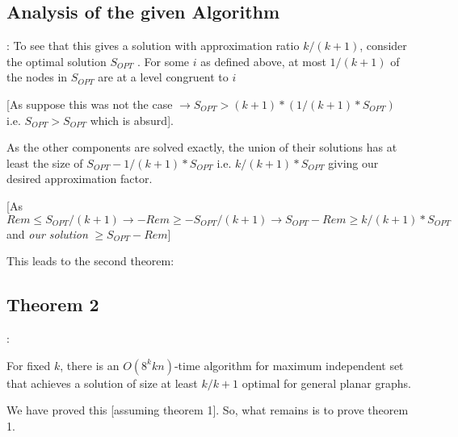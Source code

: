 \documentclass{beamer}
\begin{document}
\subsection{Analysis of the given Algorithm}
\begin{frame}{\secname : \subsecname}
    To see that this gives a solution with approximation ratio
$k/(k + 1)$, consider the optimal solution $S_{OPT}$ . For some $i$
as defined above, at most $1/(k + 1)$ of the nodes in $S_{OPT}$
are at a level congruent to $i$ 

[As suppose this was not the case $\rightarrow S_{OPT} > (k + 1) * (1/(k + 1) * S_{OPT})$ i.e. $S_{OPT} > S_{OPT}$ which is absurd]. 

As the other components
are solved exactly, the union of their solutions has at least
the size of $S_{OPT} - 1/(k + 1) * S_{OPT}$ i.e. $k/(k + 1) * S_{OPT}$ giving our desired approximation factor. 

[As $Rem \leq S_{OPT}/(k + 1) \rightarrow -Rem \geq -S_{OPT}/(k + 1) \rightarrow S_{OPT} - Rem \geq k/(k+1)*S_{OPT}$ and \textit{our solution} $\geq S_{OPT} - Rem$]

This leads to the second theorem:
\end{frame}
\subsection{Theorem 2}
\begin{frame}{\secname : \subsecname}
    \begin{theorem}
        [Baker, 1994] For fixed $k$, there is an
$O(8^kkn)$-time algorithm for maximum independent set
that achieves a solution of size at least $k/k+1$ optimal for
general planar graphs. 
    \end{theorem}

    We have proved this [assuming theorem 1]. So, what remains is to prove theorem 1.
\end{frame}
\end{document}
